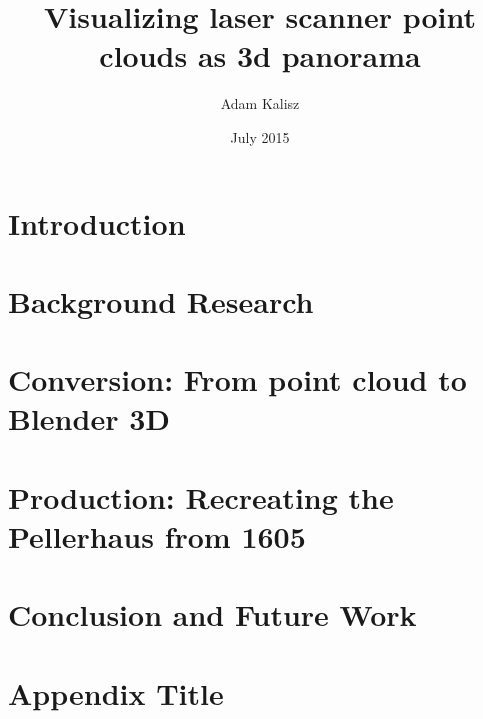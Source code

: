 \documentclass[12pt, twoside, titlepage]{book}
\title{Visualizing laser scanner point clouds as 3d panorama}
\author{Adam Kalisz}
\date{July 2015}
\begin{document}
	
	
	
	\thispagestyle{empty}
	
	
	
	

	\tableofcontents
	
	\listoffigures
	\listoftables
	
	\chapter{Introduction}
	
	\chapter{Background Research}
	
	\chapter{Conversion: From point cloud to Blender 3D}
	
	\chapter{Production: Recreating the Pellerhaus from 1605}
	
	\chapter{Conclusion and Future Work}
		
	
	
	\appendix
	\chapter{Appendix Title}
	
	
	\printbibliography
		
\end{document}
